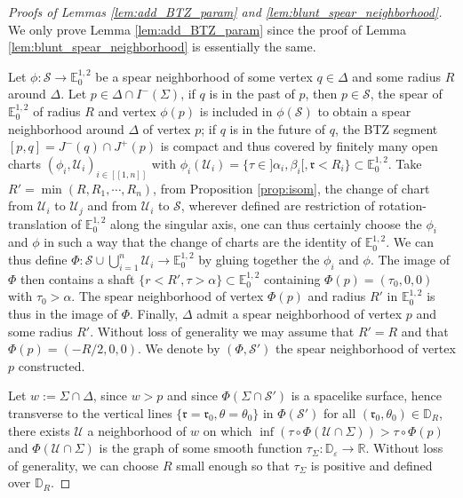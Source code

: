\documentclass[a4paper,12pt]{article}
\def\r{\mathfrak{r}}
\def\U{\mathcal U}
\def\lsem{[\![}
\def\rsem{]\!]}
\def\S{\mathcal S}
\def\S{\mathcal{S}}
\def\RR{\mathbb{R}}
\newcommand{\mass}[1]{{\mathbb E}^{1,2}_{#1}}
\begin{document}
 
    \begin{proof}[Proofs of Lemmas  \ref{lem:add_BTZ_param} and \ref{lem:blunt_spear_neighborhood}]

We only prove Lemma \ref{lem:add_BTZ_param} since the proof of Lemma \ref{lem:blunt_spear_neighborhood} is essentially the same.
       
      Let $\phi:\mathcal S\rightarrow \mass{0}$ be a spear neighborhood of some vertex $q\in \Delta$ and some radius $R$ around $\Delta$. Let $p \in \Delta\cap I^-(\Sigma)$, 
      if $q$  is in the past of $p$, then $p\in \mathcal S$, the spear of $\mass{0}$ 
      of radius $R$ and vertex $\phi(p)$ is included in $\phi(\mathcal S)$ to obtain a spear neighborhood around $\Delta$ of vertex $p$; if $q$ is in the future of $q$, the BTZ segment $[p,q]=J^-(q)\cap J^+(p)$ is compact and thus covered by finitely many open charts $(\phi_i,\U_i)_{i\in\lsem 1,n\rsem}$ with $\phi_i(\U_i)=\{\tau\in ]\alpha_i,\beta_i[,\r < R_i\}\subset \mass{0}$. Take $R' = \min(R,R_1,\cdots,R_n)$, from Proposition \ref{prop:isom}, the change of chart from $\U_i$ to $\U_j$ and from $\U_i$ to $\mathcal S$, wherever defined are restriction of rotation-translation of $\mass{0}$ along the singular axis, one can thus certainly choose the $\phi_i$ and $\phi$ in such a way that the change of charts are the identity of $\mass{0}$. We can thus define $\Phi: \mathcal S \cup \bigcup_{i=1}^n \U_i \rightarrow \mass{0}$ by gluing together the $\phi_i$ and $\phi$. The image of $\Phi$ then contains a shaft $\{r<R',\tau>\alpha\}\subset \mass{0}$ containing $\Phi(p)=(\tau_0,0,0)$ with $\tau_0>\alpha$. The spear neighborhood of vertex $\Phi(p)$ and radius $R'$ in $\mass{0}$ is thus in the image of $\Phi$. Finally, $\Delta$ admit a spear neighborhood of vertex $p$ and some radius $R'$. Without loss of generality we may assume that $R'=R$ and that $\Phi(p)=(-R/2,0,0)$.
      We denote by $(\Phi,\mathcal S')$ the spear neighborhood of vertex $p$ constructed.

      Let $w:=\Sigma \cap \Delta $, since $w>p$ and since $\Phi(\Sigma\cap \S')$ is a spacelike 
      surface, hence transverse to the vertical lines $\{\r=\r_0, \theta=\theta_0\}$ in $\Phi(\S')$ for all $(\r_0,\theta_0)\in \mathbb D_R$, there exists $\U$ a neighborhood of $w$ on which $\inf(\tau\circ \Phi(\U\cap \Sigma))>\tau\circ \Phi(p)$ and $\Phi(\U\cap\Sigma)$ is the graph of some smooth function $\tau_\Sigma : \mathbb D_\varepsilon\rightarrow \RR$.
      Without loss of generality, we can choose $R$ small enough so that  $\tau_\Sigma$ is positive and defined over $\mathbb D_R$. 
      

\end{proof}
\end{document}

